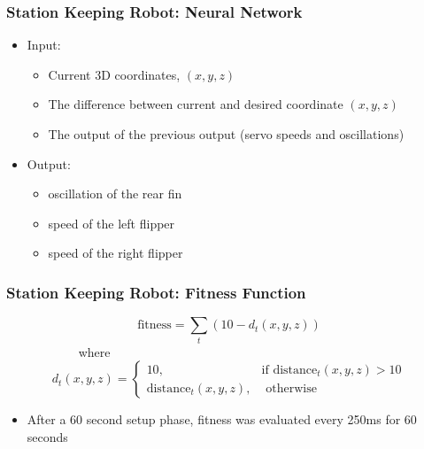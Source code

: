 \documentclass{beamer}
\begin{document}
\begin{frame}
  \frametitle{Station Keeping Robot: Neural Network}
\begin{itemize}
\item Input: 
\begin{itemize}
\item Current 3D coordinates, $(x,y,z)$
\item The difference between current and desired coordinate  $(x,y,z)$
\item The output of the previous output (servo speeds and oscillations)
\end{itemize}
\item Output:
\begin{itemize}
\item oscillation of the rear fin
\item speed of the left flipper
\item speed of the right flipper
\end{itemize}
\end{itemize}
\end{frame}

\begin{frame}
  \frametitle{Station Keeping Robot: Fitness Function}
\begin{equation*}
	\textrm{fitness} = \sum_{t} (10 - d_t(x, y, z))
\end{equation*}
~~~~~~~~~~~  where
\[
	d_t(x, y, z) = 
		\begin{cases} 10, & \textrm{if distance}_t(x, y, z) > 10 \\
					  \textrm{distance}_t(x, y, z), & \textrm{ otherwise}
		\end{cases}
\]
\begin{itemize}
\item After a 60 second setup phase, fitness was evaluated every 250ms for 60 seconds
\end{itemize}
\end{frame}


\end{document}
